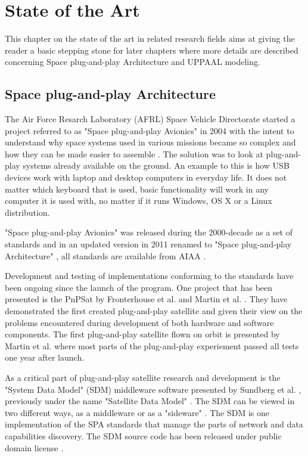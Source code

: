 \chapter{State of the Art} \label{ch:state_of_the_art}
This chapter on the state of the art in related research fields aims at giving
the reader a basic stepping stone for later chapters where more details are
described concerning Space plug-and-play Architecture and UPPAAL modeling.

\section{Space plug-and-play Architecture}
The Air Force Resarch Laboratory (AFRL) Space Vehicle Directorate started a
project referred to as "Space plug-and-play Avionics" in 2004 with the intent
to understand why space systems used in various missions became so complex and
how they can be made easier to assemble \cite{fronterhouse2007, martin2012}.
The solution was to look at plug-and-play systems already available on the
ground.  An example to this is how USB devices work with laptop and desktop
computers in everyday life. It does not matter which keyboard that is used,
basic functionality will work in any computer it is used with, no matter if
it runs Windows, OS X or a Linux distribution.

"Space plug-and-play Avionics" was released during the 2000-decade as a set of
standards and in an updated version in 2011 renamed to "Space plug-and-play
Architecture" \cite{martin2012}, all standards are available from AIAA
\cite{spa:all}.


Development and testing of implementations conforming to the standards have
been ongoing since the launch of the program. One project that has been
presented is the PnPSat by Fronterhouse et al. \cite{fronterhouse2007} and
Martin et al. \cite{martin2008}. They have demonstrated the first created
plug-and-play satellite and given their view on the problems encountered during
development of both hardware and software components. The first plug-and-play
satellite flown on orbit is presented by Martin et al. \cite{martin2012} where
most parts of the plug-and-play experiement passed all tests one year after
launch.

As a critical part of plug-and-play satellite research and development is the
"System Data Model" (SDM) middleware software presented by Sundberg et al.
\cite{sundberg2006}, previously under the name "Satellite Data Model"
\cite{spa:sdm-source}. The SDM can be viewed in two different ways, as a
middleware or as a "sideware" \cite{fronterhouse2007}. The SDM is one
implementation of the SPA standards that manage the parts of network and data
capabilities discovery. The SDM source code has been released under public
domain license \cite{spa:sdm-source}.


